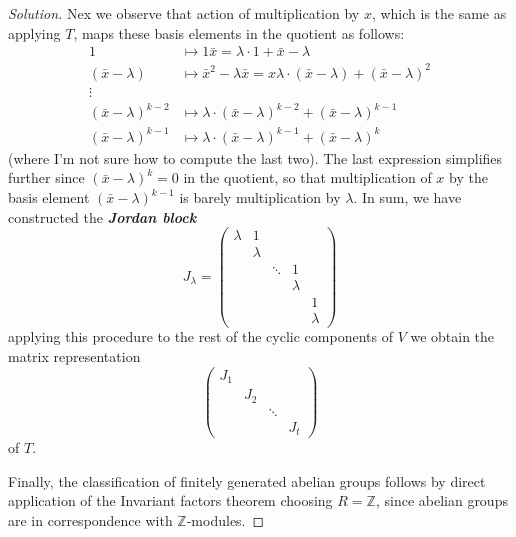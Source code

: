 \begin{proof}[Solution]
Nex we observe that action of multiplication by $x$, which is the same as applying $T$, maps these basis elements in the quotient as follows:
\begin{align*}
	1&\mapsto 1\bar{x}=\lambda\cdot 1+\bar{x}-\lambda\\
	(\bar{x}-\lambda)&\mapsto \bar{x}^2-\lambda\bar{x}=x\lambda\cdot (\bar{x}-\lambda)+(\bar{x}-\lambda)^2\\
	\vdots & \\
	(\bar{x}-\lambda)^{k-2}&\mapsto \lambda\cdot (\bar{x}-\lambda)^{k-2}+(\bar{x}-\lambda)^{k-1}\\
	(\bar{x}-\lambda)^{k-1}&\mapsto \lambda\cdot (\bar{x}-\lambda)^{k-1}+(\bar{x}-\lambda)^k
\end{align*}
(where I'm not sure how to compute the last two). The last expression simplifies further since $(\bar{x}-\lambda)^k=0$ in the quotient, so that multiplication of $x$ by the basis element $( \bar{x}-\lambda)^{k-1}$ is barely multiplication by $\lambda$. In sum, we have constructed the  \textit{\textbf{Jordan block}}
\[J_{\lambda}=\begin{pmatrix} \lambda &1\\
&\lambda\\
&&\ddots&1\\
&&&\lambda\\
&&&&1\\
&&&&\lambda
\end{pmatrix} \]
applying this procedure to the rest of the cyclic components of $V$ we obtain the  matrix representation
 \[\begin{pmatrix} J_1\\
 &J_2\\
 &&\ddots\\
 &&&J_t\end{pmatrix} \]
of $T$.

Finally, the classification of finitely generated abelian groups follows by direct application of the Invariant factors theorem choosing $R=\mathbb{Z}$, since abelian groups are in correspondence with $\mathbb{Z}$-modules.





\end{proof}


